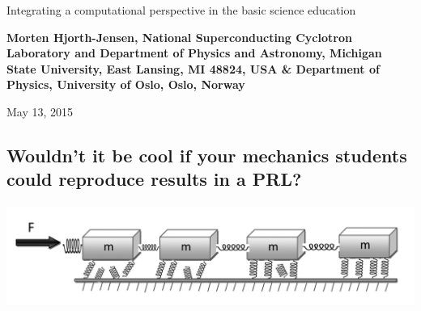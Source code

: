 \documentclass[%
twoside,                 %
final,                   %
10pt]{article}
\begin{document}






\thispagestyle{empty}

\begin{center}
{\LARGE\bf
\begin{spacing}{1.25}
Integrating a computational perspective in the basic science education
\end{spacing}
}
\end{center}


\begin{center}
{\bf Morten Hjorth-Jensen, National Superconducting Cyclotron Laboratory and Department of Physics and Astronomy, Michigan State University, East Lansing, MI 48824, USA {\&} Department of Physics, University of Oslo, Oslo, Norway${}^{}$} \\ [0mm]
\end{center}

    \begin{center}
\end{center}
    

\begin{center} %
May 13, 2015
\end{center}

\vspace{1cm}


\subsection*{Wouldn't it be cool if your mechanics students could reproduce results in a PRL?}

\paragraph{}


\centerline{\includegraphics[width=0.5\linewidth]{figures/prl1.png}}
\end{document}
